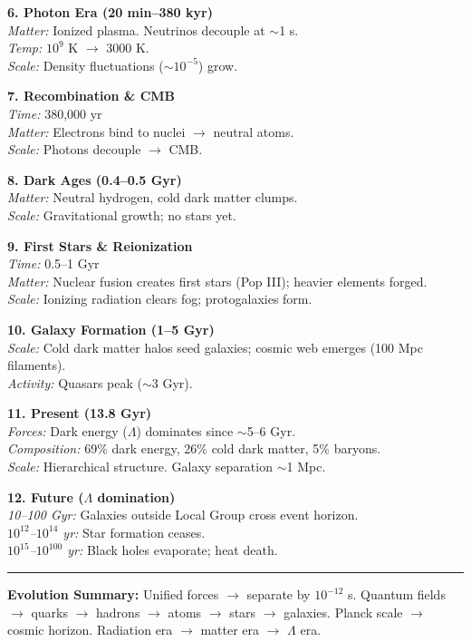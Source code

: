 \begin{center}
\begin{tcolorbox}
\begin{multicols}{2}
\textbf{6. Photon Era (20 min–380 kyr)}\\
\textit{Matter:} Ionized plasma. Neutrinos decouple at $\sim$1 s.\\
\textit{Temp:} $10^9$ K $\rightarrow$ 3000 K.\\
\textit{Scale:} Density fluctuations ($\sim10^{-5}$) grow.

\columnbreak

\textbf{7. Recombination \& CMB}\\
\textit{Time:} 380,000 yr\\
\textit{Matter:} Electrons bind to nuclei $\rightarrow$ neutral atoms.\\
\textit{Scale:} Photons decouple $\rightarrow$ CMB.

\textbf{8. Dark Ages (0.4–0.5 Gyr)}\\
\textit{Matter:} Neutral hydrogen, cold dark matter clumps.\\
\textit{Scale:} Gravitational growth; no stars yet.

\textbf{9. First Stars \& Reionization}\\
\textit{Time:} 0.5–1 Gyr\\
\textit{Matter:} Nuclear fusion creates first stars (Pop III); heavier elements forged.\\
\textit{Scale:} Ionizing radiation clears fog; protogalaxies form.

\textbf{10. Galaxy Formation (1–5 Gyr)}\\
\textit{Scale:} Cold dark matter halos seed galaxies; cosmic web emerges (100 Mpc filaments).\\
\textit{Activity:} Quasars peak ($\sim$3 Gyr).

\textbf{11. Present (13.8 Gyr)}\\
\textit{Forces:} Dark energy ($\Lambda$) dominates since $\sim$5–6 Gyr.\\
\textit{Composition:} 69\% dark energy, 26\% cold dark matter, 5\% baryons.\\
\textit{Scale:} Hierarchical structure. Galaxy separation $\sim$1 Mpc.

\textbf{12. Future ($\Lambda$ domination)}\\
\textit{10–100 Gyr:} Galaxies outside Local Group cross event horizon.\\
\textit{$10^{12}$–$10^{14}$ yr:} Star formation ceases.\\
\textit{$10^{15}$–$10^{100}$ yr:} Black holes evaporate; heat death.

\end{multicols}

\vspace{4pt}
\hrule
\vspace{4pt}
{\footnotesize\textbf{Evolution Summary:} Unified forces $\rightarrow$ separate by $10^{-12}$ s. Quantum fields $\rightarrow$ quarks $\rightarrow$ hadrons $\rightarrow$ atoms $\rightarrow$ stars $\rightarrow$ galaxies. Planck scale $\rightarrow$ cosmic horizon. Radiation era $\rightarrow$ matter era $\rightarrow$ $\Lambda$ era.}

\end{tcolorbox}
\end{center}
